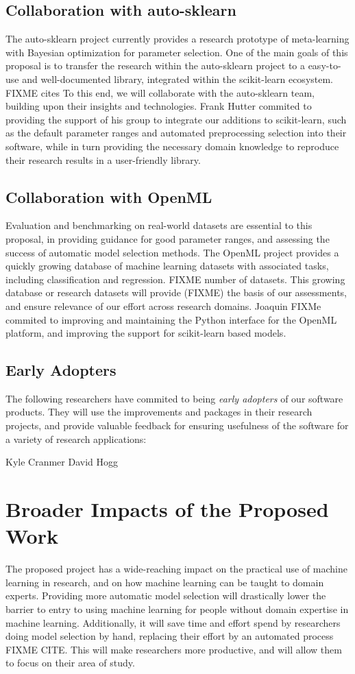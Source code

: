 \subsection{Collaboration with auto-sklearn}
The auto-sklearn project currently provides a research prototype of meta-learning
with Bayesian optimization for parameter selection. One of the main goals of this proposal
is to transfer the research within the auto-sklearn project to a easy-to-use and well-documented
library, integrated within the scikit-learn ecosystem. FIXME cites
To this end, we will collaborate with the auto-sklearn team, building upon their insights
and technologies. Frank Hutter commited to providing the support of his group to integrate our
additions to scikit-learn, such as the default parameter ranges and automated preprocessing selection
into their software, while in turn providing the necessary domain knowledge to reproduce
their research results in a user-friendly library.

\subsection{Collaboration with OpenML}
Evaluation and benchmarking on real-world datasets are essential to this proposal, in providing
guidance for good parameter ranges, and assessing the success of automatic model selection methods.
The OpenML project provides a quickly growing database of machine learning datasets with associated
tasks, including classification and regression. FIXME number of datasets.
This growing database or research datasets will provide (FIXME) the basis of our assessments, and
ensure relevance of our effort across research domains.
Joaquin FIXMe commited to improving and maintaining the Python interface for the OpenML platform,
and improving the support for scikit-learn based models.

\subsection{Early Adopters}
The following researchers have commited to being \emph{early adopters} of our software
products. They will use the improvements and packages in their research projects,
and provide valuable feedback for ensuring usefulness of the software for a
variety of research applications:

Kyle Cranmer
David Hogg

\section{Broader Impacts of the Proposed Work}
The proposed project has a wide-reaching impact on the practical use of
machine learning in research, and on how machine learning can be taught to
domain experts.
Providing more automatic model selection will drastically lower the barrier
to entry to using machine learning for people without domain expertise
in machine learning.
Additionally, it will save time and effort spend by researchers doing
model selection by hand, replacing their effort by an automated process FIXME CITE\@.
This will make researchers more productive, and will allow them to focus
on their area of study.

